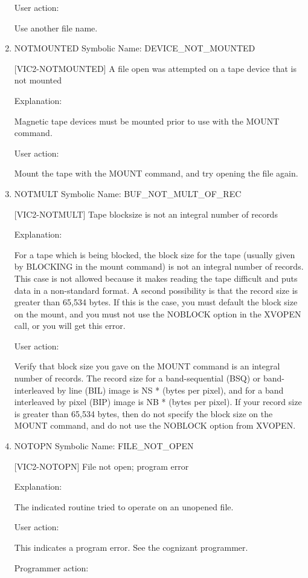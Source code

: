 \begin{enumerate}
User action:

Use another file name.


\item NOTMOUNTED Symbolic Name: DEVICE\_NOT\_MOUNTED

[VIC2-NOTMOUNTED] A file open was attempted on a tape device that is not mounted

Explanation:

Magnetic tape devices must be mounted prior to use with the
MOUNT command.

User action:

Mount the tape with the MOUNT command, and try opening
the file again.


\item NOTMULT Symbolic Name: BUF\_NOT\_MULT\_OF\_REC

[VIC2-NOTMULT] Tape blocksize is not an integral number of records

Explanation:

For a tape which is being blocked, the block size for the tape (usually
given by BLOCKING in the mount command) is not an integral number of records.
This case is not allowed because it makes reading the tape difficult and puts
data in a non-standard format.  A second possibility is that the record size
is greater than 65,534 bytes.  If this is the case, you must default the
block size on the mount, and you must not use the NOBLOCK option in the
XVOPEN call, or you will get this error.

User action:

Verify that block size you gave on the MOUNT command is an integral number
of records.  The record size for a band-sequential (BSQ) or band-interleaved
by line (BIL) image is NS * (bytes per pixel), and for a band interleaved by
pixel (BIP) image is NB * (bytes per pixel).  If your record size is greater
than 65,534 bytes, then do not specify the block size on the MOUNT command,
and do not use the NOBLOCK option from XVOPEN.


\item NOTOPN Symbolic Name: FILE\_NOT\_OPEN

[VIC2-NOTOPN] File not open; program error

Explanation:

The indicated routine tried to operate on an unopened file.

User action:

This indicates a program error.  See the cognizant programmer.

Programmer action:


\end{enumerate}

